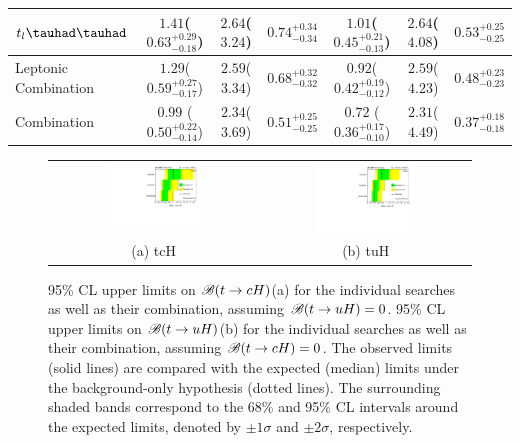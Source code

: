 \begin{table}[t!]
\begin{center}
{\begin{tabular}{lcccccc}
$t_l\thadhad$                   &$1.41$($0.63^{+0.29}_{-0.18}$) &$2.64$($3.24$)   &$0.74^{+0.34}_{-0.34}$  & $1.01$($0.45^{+0.21}_{-0.13}$) & $2.64$($4.08$)  &$0.53^{+0.25}_{-0.25}$\\ \midrule
Leptonic Combination            &$1.29$($0.59^{+0.27}_{-0.17}$) &$2.59$($3.34$)   &$0.68^{+0.32}_{-0.32}$  & $0.92$($0.42^{+0.19}_{-0.12}$) & $2.59$($4.23$)  &$0.48^{+0.23}_{-0.23}$\\
\midrule
Combination                     &$0.99$ ($0.50^{+0.22}_{-0.14}$)&$2.34$($3.69$)   &$0.51^{+0.25}_{-0.25}$ & $0.72$ ($0.36^{+0.17}_{-0.10}$)& $2.31$($4.49$)&$0.37^{+0.18}_{-0.18}$  \\
\bottomrule\bottomrule
\end{tabular}
}
\label{tab:limits_summary}
\end{center}
\end{table}






\begin{figure}[h!]
\begin{center}
\begin{tabular}{@{}cc@{}}
\includegraphics[width=0.49\textwidth]{figures/tcH_Limits.pdf}&
\includegraphics[width=0.49\textwidth]{figures/tuH_Limits.pdf}\\
(a) tcH & (b) tuH \\
\end{tabular}
\caption{\small {95\% CL upper limits on $\mathscr{B}(t\to cH)$(a) for the individual searches as well as their
combination, assuming $\mathscr{B}(t\to uH)=0$. 95\% CL upper limits on $\mathscr{B}(t\to uH)$(b) for the individual searches as well as their
combination, assuming $\mathscr{B}(t\to cH)=0$. The observed limits (solid lines) are compared with the 
expected (median) limits under the background-only hypothesis (dotted lines). The surrounding shaded bands correspond to the 68\% and 95\% CL intervals around the expected limits, 
denoted by $\pm 1\sigma$ and $\pm 2\sigma$, respectively.
}}
\label{fig:limits_combo_1D_hc} 
\end{center}
\end{figure}

